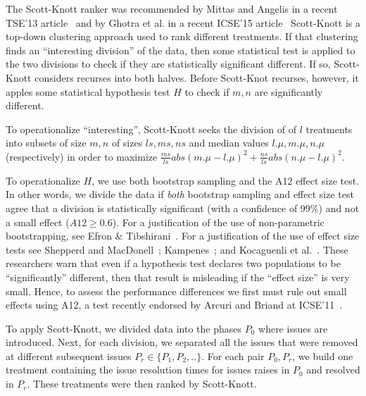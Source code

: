 \documentclass[smallcondensed]{svjour3}
\begin{document}
    The Scott-Knott ranker 
      was   recommended  by  Mittas and Angelis in a
    recent TSE'13 article~\cite{mittas13} and by Ghotra et al. in a recent
    ICSE'15 article~\cite{ghotra2015icse}
    Scott-Knott is a 
    top-down clustering approach used to rank different treatments. If that 
    clustering finds an ``interesting division'' of the data, then some 
    statistical test is applied to the two divisions to check if they are 
    statistically significant different. If so, Scott-Knott considers recurses into both 
    halves.
    Before Scott-Knot recurses,  however,  it apples some  statistical hypothesis test $H$ to check
    if $m,n$ are significantly different. 
    
    To operationalize ``interesting'', Scott-Knott seeks the division of 
    of $l$ treatments into subsets of size $m,n$ of sizes $ls,ms,ns$ and median values
    $l.\mu, m.\mu, n.\mu$ (respectively) in order to maximize
 $\frac{ms}{ls}abs(m.\mu - l.\mu)^2 + \frac{ns}{ls}abs(n.\mu - l.\mu)^2$.
   
   To operationalize $H$, we use both  bootstrap sampling  and the A12 effect size test.
   In other 
    words, we divide the data if \textit{both} bootstrap sampling and effect 
    size test agree that a division is statistically significant (with a 
    confidence of 99\%) and not a small effect ($A12 \ge 0.6$).
    For a justification of the use of non-parametric bootstrapping, see Efron 
    \& Tibshirani~\cite[p220-223]{efron93}. For a justification of the use of 
    effect size tests see Shepperd and MacDonell~\cite{shepperd12a}; 
    Kampenes~\cite{kampenes07}; and Kocaguenli et 
    al.~\cite{Kocaguneli2013:ep}. These researchers warn that even if a 
    hypothesis test declares two populations to be ``significantly'' 
    different, then that result is misleading if the ``effect size'' is very 
    small. Hence, to assess the performance differences we first must rule out 
    small effects using A12, a test   recently endorsed by Arcuri and 
    Briand at ICSE'11~\cite{arcuri11}.
  
    
    To  apply Scott-Knott, we divided data into the phases $P_0$ where issues are introduced. Next, for each division, we separated all the issues that were removed at different subsequent issues $P_r \in \{P_1,P_2,..\}$.
    For each pair $P_0,P_r$, we build one treatment containing the  issue resolution times for     issues raises in $P_0$ and resolved in $P_r$. These treatments
    were then ranked by Scott-Knott. 
     
\end{document}
